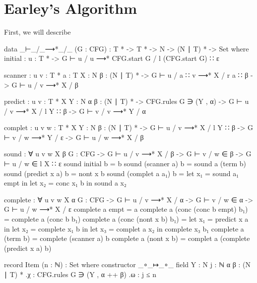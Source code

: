 \chapter{Earley's Algorithm}

	First, we will describe 

	\begin{code}
		data _⊢_/_⟶*_/_ (G : CFG) : T * -> T * -> N -> (N ∣ T) * -> Set where
		  initial : {u : T *} ->
		    G ⊢ u / u ⟶* CFG.start G / l (CFG.start G) ∷ ε
		
		  scanner : {u v : T *} {a : T} {X : N} {β : (N ∣ T) *} ->
		    G ⊢ u / a ∷ v ⟶* X / r a ∷ β ->
		      G ⊢ u / v ⟶* X / β
		
		  predict : {u v : T *} {X Y : N} {α β : (N ∣ T) *} ->
		    CFG.rules G ∋ (Y , α) ->
		    G ⊢ u / v ⟶* X / l Y ∷ β ->
		      G ⊢ v / v ⟶* Y / α
		
		  complet : {u v w : T *} {X Y : N} {β : (N ∣ T) *} ->
		    G ⊢ u / v ⟶* X / l Y ∷ β ->
		    G ⊢ v / w ⟶* Y / ε ->
		      G ⊢ u / w ⟶* X / β
		
	\end{code}

	\begin{code}

		sound : ∀ {u v w X β} {G : CFG} ->
		  G ⊢ u / v ⟶* X / β ->
		  G ⊢ v / w ∈ β ->
		    G ⊢ u / w ∈ l X ∷ ε
		sound initial b = b
		sound (scanner a) b = sound a (term b)
		sound (predict x a) b = nont x b
		sound (complet a a₁) b =
		  let x₁ = sound a₁ empt in
		  let x₂ = conc x₁ b in
		  sound a x₂

	\end{code}

	\begin{code}
		
		complete : ∀ {u v w X α} {G : CFG} ->
		  G ⊢ u / v ⟶* X / α ->
		  G ⊢ v / w ∈ α ->
		    G ⊢ u / w ⟶* X / ε
		complete a empt = a
		complete a (conc (conc b empt) b₁) = complete a (conc b b₁)
		complete a (conc (nont x b) b₁) =
		  let x₁ = predict x a in
		  let x₂ = complete x₁ b in
		  let x₃ = complet a x₂ in
		  complete x₃ b₁
		complete a (term b) = complete (scanner a) b
		complete a (nont x b) = complet a (complete (predict x a) b)

	\end{code}
	
	\begin{code}

		record Item (n : ℕ) : Set where
		  constructor _∘_↦_∘_
		  field
		    Y : N
		    j : ℕ
		    α β : (N ∣ T) *
		    .{χ} : CFG.rules G ∋ (Y , α ++ β)
		    .{ω} : j ≤ n

	\end{code}

